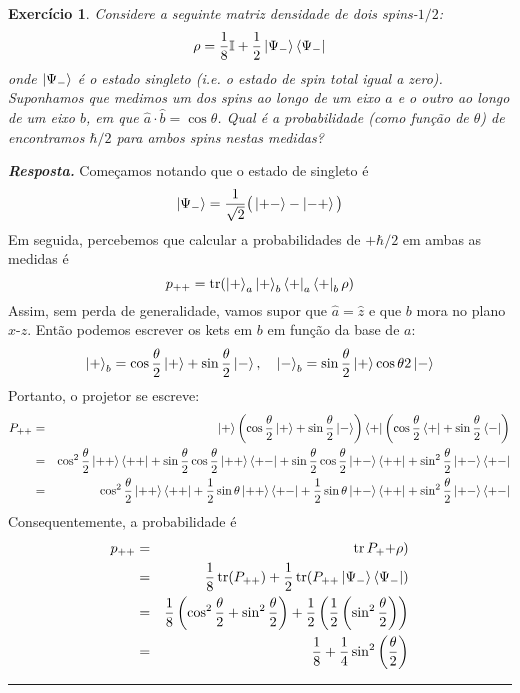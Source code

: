 \documentclass[12pt]{article}
\def\be{\begin{equation}}
\def\ee{\end{equation}}
\def\bea{\begin{eqnarray*}}
\def\eea{\end{eqnarray*}}
\def\f{\frac}
\def\l{\left}
\def\r{\right}
\newtheorem{exercise}{Exercício}
\newenvironment{answer}{\noindent\textbf{\textit{Resposta.}} \normalfont }{\par\noindent\rule{\textwidth}{0.4pt}}
\DeclareMathOperator{\tr}{tr}
\begin{document}
	
	\begin{exercise}
		Considere a seguinte matriz densidade de dois spins-$1/2$:
		\be
			\rho = \f{1}{8}\mathbb{I} + \f{1}{2} \ket{\Psi_-}\bra{\Psi_-}
 		\ee
		onde $\ket{\Psi_-}$ é o estado singleto (i.e. o estado de spin total igual a zero). Suponhamos que medimos um dos spins ao longo de um eixo $a$ e o outro ao longo de um eixo $b$, em que $\hat{a}\cdot\hat{b}=\cos\theta$. Qual é a probabilidade (como função de $\theta$) de encontramos $\hbar/2$ para ambos spins nestas medidas?
	\end{exercise}
	\begin{answer}
		Começamos notando que o estado de singleto é
		\be
			\ket{\Psi_-} = \f{1}{\sqrt{2}}\big( \ket{+-} - \ket{-+} \big)	
		\ee
		Em seguida, percebemos que calcular a probabilidades de $+\hbar/2$ em ambas as medidas é
		\be
			p_{++} = \tr( \ket{+}_a\ket{+}_b\bra{+}_a\bra{+}_b \rho)
		\ee
		Assim, sem perda de generalidade, vamos supor que $\hat{a}=\hat{z}$ e que $b$ mora no plano $x$-$z$. Então podemos escrever os kets em $b$ em função da base de $a$:
		\be
			\ket{+}_b = \cos\f{\theta}{2}\ket{+} + \sin\f{\theta}{2} \ket{-}, \quad \ket{-}_b = \sin\f{\theta}{2}\ket{+}  \cos{\theta}{2} \ket{-}
		\ee
		Portanto, o projetor se escreve:
		\bea
			P_{++} &=&  \ket{+}\l( \cos\f{\theta}{2}\ket{+} + \sin\f{\theta}{2} \ket{-}\r) \bra{+}\l(\cos\f{\theta}{2}\bra{+} + \sin\f{\theta}{2} \bra{-}\r) \\
				&=& \cos^2\f{\theta}{2}\ket{++}\bra{++} + \sin\f{\theta}{2}\cos\f{\theta}{2} \ket{++}\bra{+-} + \sin\f{\theta}{2}\cos\f{\theta}{2} \ket{+-}\bra{++} + \sin^2\f{\theta}{2} \ket{+-}\bra{+-} \\
				&=& \cos^2\f{\theta}{2}\ket{++}\bra{++} + \f{1}{2} \sin\theta \ket{++}\bra{+-} + \f{1}{2} \sin\theta\ket{+-}\bra{++} + \sin^2\f{\theta}{2} \ket{+-}\bra{+-}
		\eea
		Consequentemente, a probabilidade é
		\bea
			p_{++} &=& \tr{P_++}\rho) \\
				&=& \f{1}{8} \tr(P_{++}) + \f{1}{2} \tr(P_{++}\ket{\Psi_-}\bra{\Psi_-}) \\
				&=& \f{1}{8} \l( \cos^2\f{\theta}{2} + \sin^2\f{\theta}{2} \r) + \f{1}{2} \l( \f{1}{2} \l( \sin^2\f{\theta}{2} \r) \r) \\
				&=& \f{1}{8} + \f{1}{4}\sin^2\l(\f{\theta}{2}\r)
		\eea
	\end{answer}
\end{document}

